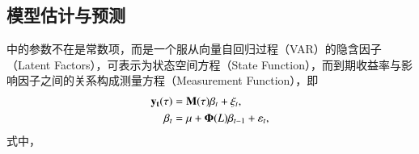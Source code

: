 
\subsection{模型估计与预测}
\dns 中的参数不在是常数项，而是一个服从向量自回归过程（VAR）的隐含因子（Latent Factors），可表示为状态空间方程（State Function），而到期收益率与影响因子之间的关系构成测量方程（Measurement Function），即
\begin{align}
\mathbf{y_t(\tau)} &= \mathcal{\mathbf{M}}(\mathbf{\tau}) \mathbf{\beta}_t  + \mathbf{\xi}_t, \\
\mathbf{\beta}_t &= \mathbf{\mu} + \mathbf{\Phi}(L)\mathbf{\beta}_{t-1} + \mathbf{\varepsilon}_t,
\end{align}
式中，
